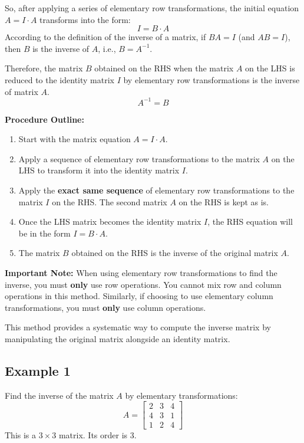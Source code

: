 \documentclass{article}
\begin{document}
So, after applying a series of elementary row transformations, the initial equation $A = I \cdot A$ transforms into the form:
\[ I = B \cdot A \]
According to the definition of the inverse of a matrix, if $BA = I$ (and $AB=I$), then $B$ is the inverse of $A$, i.e., $B = A^{-1}$.

Therefore, the matrix $B$ obtained on the RHS when the matrix $A$ on the LHS is reduced to the identity matrix $I$ by elementary row transformations is the inverse of matrix $A$.
\[ A^{-1} = B \]

\textbf{Procedure Outline:}
\begin{enumerate}
    \item Start with the matrix equation $A = I \cdot A$.
    \item Apply a sequence of elementary row transformations to the matrix $A$ on the LHS to transform it into the identity matrix $I$.
    \item Apply the \textbf{exact same sequence} of elementary row transformations to the matrix $I$ on the RHS. The second matrix $A$ on the RHS is kept as is.
    \item Once the LHS matrix becomes the identity matrix $I$, the RHS equation will be in the form $I = B \cdot A$.
    \item The matrix $B$ obtained on the RHS is the inverse of the original matrix $A$.
\end{enumerate}

\textbf{Important Note:} When using elementary row transformations to find the inverse, you must \textbf{only} use row operations. You cannot mix row and column operations in this method. Similarly, if choosing to use elementary column transformations, you must \textbf{only} use column operations.

This method provides a systematic way to compute the inverse matrix by manipulating the original matrix alongside an identity matrix.

\subsection{Example 1} %
Find the inverse of the matrix $A$ by elementary transformations:
\[ A = \begin{bmatrix} 2 & 3 & 4 \\ 4 & 3 & 1 \\ 1 & 2 & 4 \end{bmatrix} \]
This is a $3 \times 3$ matrix. Its order is 3.
\end{document}
